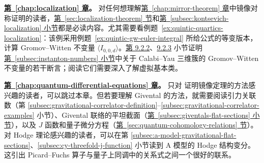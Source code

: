 \noindent\textbf{\hyperref[chap:localization]{第~\ref*{chap:localization} 章}。} 对任何想理解\hyperref[chap:mirror-theorem]{第~\ref*{chap:mirror-theorem} 章}中镜像对称证明的读者，\hyperref[sec:localization-theorem]{第~\ref*{sec:localization-theorem} 节}和\hyperref[subsec:kontsevich-localization]{第~\ref*{subsec:kontsevich-localization} 小节}都是必读内容。尤其需要看例题~\ref{ex:quintic-quartics-localization}：该例采用例题~\ref{ex:quintic-gw-euler-integral} 所给公式的等变版本，计算 Gromov--Witten 不变量 $\langle I_{0,0,d}\rangle$。\hyperref[subsec:multiple-cover-localization]{第 9.2.2}、\hyperref[subsec:nodal-quintic-double-covers]{9.2.3} 小节证明\hyperref[subsec:instanton-numbers]{第~\ref*{subsec:instanton-numbers} 小节}中关于 Calabi--Yau 三维簇的 Gromov--Witten 不变量的若干断言；阅读它们需要深入了解虚拟基本类。

\noindent\textbf{\hyperref[chap:quantum-differential-equations]{第~\ref*{chap:quantum-differential-equations} 章}。} 只对  证明镜像定理的方法感兴趣的读者，可以跳过本章。但若要理解 Givental 的方法，就需要阅读引力关联数（第 \hyperref[subsec:gravitational-correlator-definition]{\ref*{subsec:gravitational-correlator-definition}}--\hyperref[subsec:gravitational-correlator-examples]{\ref*{subsec:gravitational-correlator-examples}} 小节）、Givental 联络的平坦截面（\hyperref[subsec:giventals-flat-sections]{第~\ref*{subsec:giventals-flat-sections} 小节}），以及 $J$ 函数和量子微分方程（\hyperref[sec:quantum-cohomology-relations]{第~\ref*{sec:quantum-cohomology-relations} 节}）。对 Hodge 理论感兴趣的读者，可以在第 \hyperref[subsec:a-model-gravitational-flat-sections]{\ref*{subsec:a-model-gravitational-flat-sections}}、\hyperref[subsec:cy-threefold-j-function]{\ref*{subsec:cy-threefold-j-function}} 小节读到 A 模型的 Hodge 结构变分。这引出 Picard--Fuchs 算子与量子上同调中的关系式之间一个很好的联系。

